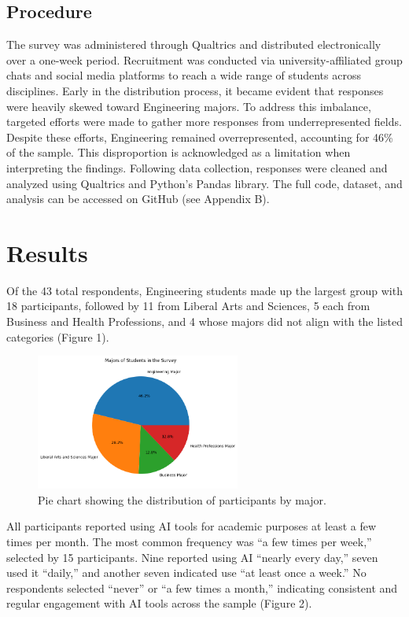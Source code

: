 \documentclass[12pt]{article}
\begin{document}
\subsection{Procedure}
\label{subsec:procedure}
The survey was administered through Qualtrics and distributed electronically over a one-week period. Recruitment was conducted via university-affiliated group chats and social media platforms to reach a wide range of students across disciplines.
Early in the distribution process, it became evident that responses were heavily skewed toward Engineering majors. To address this imbalance, targeted efforts were made to gather more responses from underrepresented fields. Despite these efforts, Engineering remained overrepresented, accounting for 46\% of the sample. This disproportion is acknowledged as a limitation when interpreting the findings.
Following data collection, responses were cleaned and analyzed using Qualtrics and Python’s Pandas library. The full code, dataset, and analysis can be accessed on GitHub (see Appendix B).




\section{Results}
Of the 43 total respondents, Engineering students made up the largest group with 18 participants, followed by 11 from Liberal Arts and Sciences, 5 each from Business and Health Professions, and 4 whose majors did not align with the listed categories (Figure 1).


\begin{figure}[htbp]
  \centering
  \includegraphics[width=0.6\textwidth]{fig1.png} %
  \caption{Pie chart showing the distribution of participants by major.}
  \label{fig:example1}
\end{figure}

All participants reported using AI tools for academic purposes at least a few times per month. The most common frequency was “a few times per week,” selected by 15 participants. Nine reported using AI “nearly every day,” seven used it “daily,” and another seven indicated use “at least once a week.” No respondents selected “never” or “a few times a month,” indicating consistent and regular engagement with AI tools across the sample (Figure 2).
\end{document}
